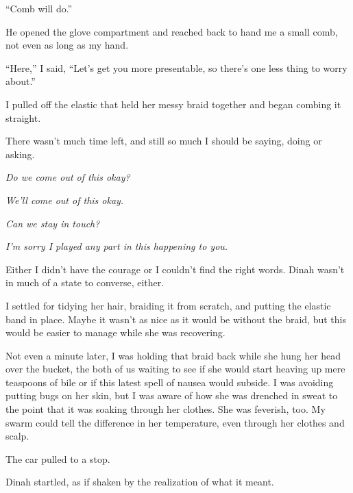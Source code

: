 ``Comb will do.''



He opened the glove compartment and reached back to hand me a small comb, not even as long as my hand.



``Here,'' I said, ``Let's get you more presentable, so there's one less thing to worry about.''



I pulled off the elastic that held her messy braid together and began combing it straight.



There wasn't much time left, and still so much I should be saying, doing or asking.



\emph{Do we come out of this okay?}



\emph{We'll come out of this okay.}



\emph{Can we stay in touch?}



\emph{I'm sorry I played any part in this happening to you.}



Either I didn't have the courage or I couldn't find the right words.  Dinah wasn't in much of a state to converse, either.



I settled for tidying her hair, braiding it from scratch, and putting the elastic band in place.  Maybe it wasn't as nice as it would be without the braid, but this would be easier to manage while she was recovering.



Not even a minute later, I was holding that braid back while she hung her head over the bucket, the both of us waiting to see if she would start heaving up mere teaspoons of bile or if this latest spell of nausea would subside.  I was avoiding putting bugs on her skin, but I was aware of how she was drenched in sweat to the point that it was soaking through her clothes.  She was feverish, too.  My swarm could tell the difference in her temperature, even through her clothes and scalp.



The car pulled to a stop.



Dinah startled, as if shaken by the realization of what it meant.



